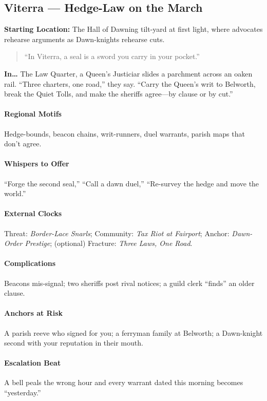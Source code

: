 \subsection*{Viterra — Hedge-Law on the March}
\textbf{Starting Location:} The Hall of Dawning tilt-yard at first light, where advocates rehearse arguments as Dawn-knights rehearse cuts.
\begin{quote}
“In Viterra, a seal is a sword you carry in your pocket.”
\end{quote}

\textbf{In…} The Law Quarter, a Queen’s Justiciar slides a parchment across an oaken rail. “Three charters, one road,” they say. “Carry the Queen’s writ to Belworth, break the Quiet Tolls, and make the sheriffs agree—by clause or by cut.”

\paragraph{Regional Motifs} Hedge-bounds, beacon chains, writ-runners, duel warrants, parish maps that don’t agree.

\paragraph{Whispers to Offer} “Forge the second seal,” “Call a dawn duel,” “Re-survey the hedge and move the world.”

\paragraph{External Clocks} 
Threat: \emph{Border-Lace Snarls}; Community: \emph{Tax Riot at Fairport}; Anchor: \emph{Dawn-Order Prestige}; (optional) Fracture: \emph{Three Laws, One Road}.

\paragraph{Complications} Beacons mis-signal; two sheriffs post rival notices; a guild clerk “finds” an older clause.

\paragraph{Anchors at Risk} A parish reeve who signed for you; a ferryman family at Belworth; a Dawn-knight second with your reputation in their mouth.

\paragraph{Escalation Beat} A bell peals the wrong hour and every warrant dated this morning becomes “yesterday.”

